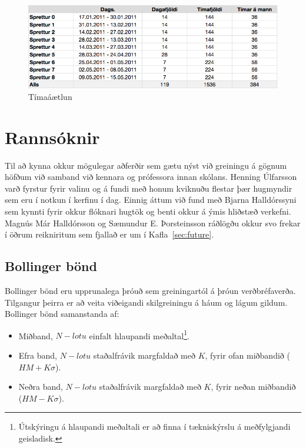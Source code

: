 \documentclass{article}
\begin{document}
\begin{figure}[H]
  \centering
  \includegraphics[width=1\textwidth]{sprettir_timar.png} 
  \caption{Tímaáætlun} 
  \label{fig:timeplan}
\end{figure}


\newpage


\section{Rannsóknir}
\label{sec:research}
Til að kynna okkur mögulegar aðferðir sem gætu nýst við greiningu á gögnum
höfðum við samband við kennara og prófessora innan skólans. Henning Úlfarsson
varð fyrstur fyrir valinu og á fundi með honum kviknuðu flestar þær hugmyndir sem eru
í notkun í kerfinu í dag. Einnig áttum við fund með Bjarna Halldórssyni sem
kynnti fyrir okkur flóknari hugtök og benti okkur á ýmis hliðstæð verkefni.
Magnús Már Halldórsson og Sæmundur E. Þorsteinsson ráðlögðu okkur svo frekar í
öðrum reikniritum sem fjallað er um í Kafla~\ref{sec:future}.



\subsection{Bollinger bönd}
\label{sec:research_bollinger_bands}

Bollinger bönd eru upprunalega þróuð sem greiningartól
á þróun verðbréfaverða. 
Tilgangur þeirra er að veita viðeigandi skilgreiningu á háum og lágum gildum.
 \\

Bollinger bönd samanstanda af:



\begin{itemize}
  \item Miðband, $N-lotu$ einfalt hlaupandi meðaltal\footnote[1]{Útskýringu á
hlaupandi meðaltali er að finna í tækniskýrslu á meðfylgjandi geisladisk.}.
  \item Efra band, $N-lotu$ staðalfrávik margfaldað með $K$, fyrir ofan
miðbandið ($HM + K\sigma$).
  \item Neðra band, $N-lotu$ staðalfrávik margfaldað með $K$, fyrir neðan
miðbandið ($HM -K\sigma$).
\end{itemize}
\end{document}
